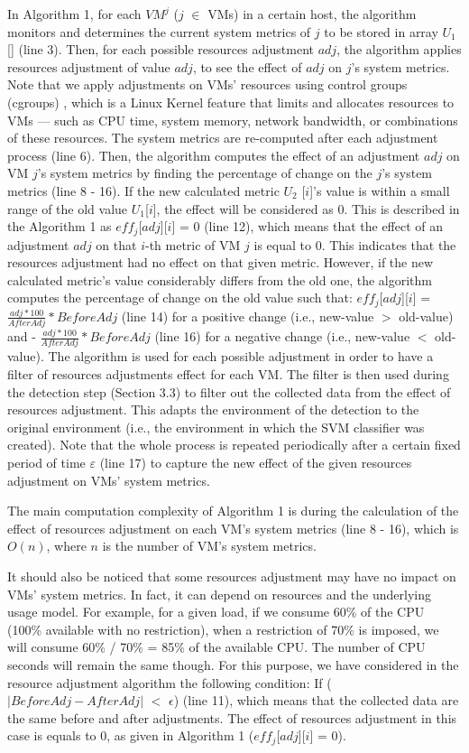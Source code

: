 \documentclass[twocolumn]{bmcart}%
\begin{document}
In Algorithm 1, for each $VM^{j}$ ($j$ $\in$ VMs) in a certain host, the algorithm monitors and determines the current system metrics of $j$ to be stored in array $U_{1}$ [] (line 3). Then, for each possible resources adjustment $adj$, the algorithm applies resources adjustment of value $adj$, to see the effect of $adj$ on $j$'s system metrics. Note that we apply adjustments on VMs' resources using control groups (cgroups) \cite{cgroups:2016}, which is a Linux Kernel feature that limits and allocates resources to VMs — such as CPU time, system memory, network bandwidth, or combinations of these resources. The system metrics are re-computed after each adjustment process (line 6). Then, the algorithm computes the effect of an adjustment $adj$ on VM $j$'s system metrics by finding the percentage of change on the $j$'s system metrics (line 8 - 16). If the new calculated metric $U_{2}$ [$i$]'s value is within a small range of the old value $U_{1}$[$i$], the effect will be considered as 0. This is described in the Algorithm 1 as $eff_{j}$[$adj$][$i$] = 0 (line 12), which means that the effect of an adjustment $adj$ on that $i$-th metric of VM $j$ is equal to 0. This indicates that the resources adjustment had no effect on that given metric. However, if the new calculated metric's value considerably differs from the old one, the algorithm computes the percentage of change on the old value such that: $eff_{j}$[$adj$][$i$] = $\frac{adj*100}{AfterAdj}  * BeforeAdj$ (line 14) for a positive change (i.e., new-value $>$ old-value) and - $\frac{adj*100}{AfterAdj}  * BeforeAdj$ (line 16) for a negative change (i.e., new-value  $<$ old-value). The algorithm is used for each possible adjustment in order to have a filter of resources adjustments effect for each VM. The filter is then used during the detection step (Section 3.3) to filter out the collected data from the effect of resources adjustment. This adapts the environment of the detection to the original environment (i.e., the environment in which the SVM classifier was created). Note that the whole process is repeated periodically after a certain fixed period of time $\varepsilon$ (line 17) to capture the new effect of the given resources adjustment on VMs' system metrics.

The main computation complexity of Algorithm 1 is during the calculation of the effect of resources adjustment on each VM's system metrics (line 8 - 16), which is $O(n)$, where $n$ is the number of VM's system metrics.

It should also be noticed that some resources adjustment may have no impact on VMs' system metrics. In fact, it can depend on resources and the underlying usage model. For example, for a given load,  if we consume 60\% of the CPU (100\% available with no restriction), when a restriction of 70\% is imposed, we will consume 60\% / 70\% = 85\% of the available CPU. The number of CPU seconds will remain the same though. For this purpose, we have considered in the resource adjustment algorithm the following condition: If ($|BeforeAdj -  AfterAdj|$ $<$ $\epsilon$) (line 11), which means that the collected data are the same before and after adjustments. The effect of resources adjustment in this case is equals to 0, as given in Algorithm 1 ($eff_{j}$[$adj$][$i$] = 0).
\end{document}
